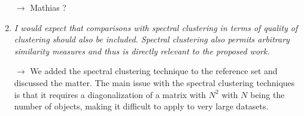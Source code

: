 \documentclass[10pt]{article}
\begin{document}
\begin{enumerate}
$\rightarrow$ Mathias ?

\item \emph{I would expect that comparisons with spectral clustering in terms of quality of clustering should also be included. Spectral clustering also permits arbitrary similarity measures and thus is directly relevant to the proposed work.}

$\rightarrow$ We added the spectral clustering technique to the reference set and discussed the matter. The main issue with the spectral clustering techniques is that it requires a diagonalization of a matrix with $N^2$ with $N$ being the number of objects, making it difficult to apply to very large datasets.

\end{enumerate}
\end{document}
